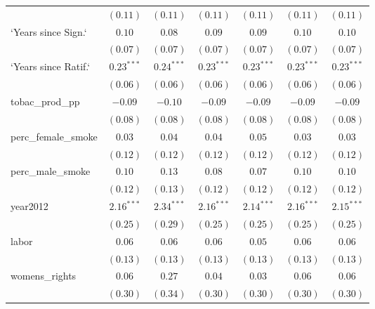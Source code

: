 \begin{table}[!h]
\begin{center}
\begin{tabular}{l c c c c c c }
                        & $(0.11)$     & $(0.11)$     & $(0.11)$     & $(0.11)$     & $(0.11)$     & $(0.11)$     \\
`Years since Sign.`     & $0.10$       & $0.08$       & $0.09$       & $0.09$       & $0.10$       & $0.10$       \\
                        & $(0.07)$     & $(0.07)$     & $(0.07)$     & $(0.07)$     & $(0.07)$     & $(0.07)$     \\
`Years since Ratif.`    & $0.23^{***}$ & $0.24^{***}$ & $0.23^{***}$ & $0.23^{***}$ & $0.23^{***}$ & $0.23^{***}$ \\
                        & $(0.06)$     & $(0.06)$     & $(0.06)$     & $(0.06)$     & $(0.06)$     & $(0.06)$     \\
tobac\_prod\_pp         & $-0.09$      & $-0.10$      & $-0.09$      & $-0.09$      & $-0.09$      & $-0.09$      \\
                        & $(0.08)$     & $(0.08)$     & $(0.08)$     & $(0.08)$     & $(0.08)$     & $(0.08)$     \\
perc\_female\_smoke     & $0.03$       & $0.04$       & $0.04$       & $0.05$       & $0.03$       & $0.03$       \\
                        & $(0.12)$     & $(0.12)$     & $(0.12)$     & $(0.12)$     & $(0.12)$     & $(0.12)$     \\
perc\_male\_smoke       & $0.10$       & $0.13$       & $0.08$       & $0.07$       & $0.10$       & $0.10$       \\
                        & $(0.12)$     & $(0.13)$     & $(0.12)$     & $(0.12)$     & $(0.12)$     & $(0.12)$     \\
year2012                & $2.16^{***}$ & $2.34^{***}$ & $2.16^{***}$ & $2.14^{***}$ & $2.16^{***}$ & $2.15^{***}$ \\
                        & $(0.25)$     & $(0.29)$     & $(0.25)$     & $(0.25)$     & $(0.25)$     & $(0.25)$     \\
labor                   & $0.06$       & $0.06$       & $0.06$       & $0.05$       & $0.06$       & $0.06$       \\
                        & $(0.13)$     & $(0.13)$     & $(0.13)$     & $(0.13)$     & $(0.13)$     & $(0.13)$     \\
womens\_rights          & $0.06$       & $0.27$       & $0.04$       & $0.03$       & $0.06$       & $0.06$       \\
                        & $(0.30)$     & $(0.34)$     & $(0.30)$     & $(0.30)$     & $(0.30)$     & $(0.30)$     \\

\end{tabular}
\end{center}
\end{table}
